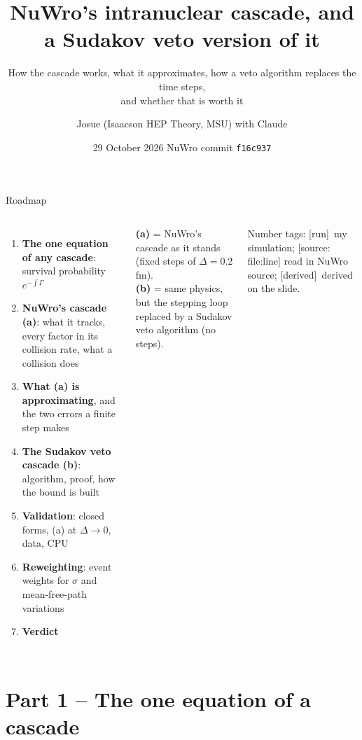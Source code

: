 \documentclass[10pt,aspectratio=169]{beamer}
\title{NuWro's intranuclear cascade, and a Sudakov veto version of it}
\subtitle{How the cascade works, what it approximates, how a veto algorithm replaces the time steps,\\ and whether that is worth it}
\author{Josue (Isaacson HEP Theory, MSU) \quad with Claude}
\date{29 October 2026 \quad\textbullet\quad NuWro commit \texttt{f16c937}}
\newcommand{\G}{\Gamma}
\newcommand{\tagrun}{{\scriptsize\color{okGreen}[run]}}
\newcommand{\tagsrc}[1]{{\scriptsize\color{aBlue}[source: #1]}}
\newcommand{\tagder}{{\scriptsize\color{black!60}[derived]}}
\begin{document}
\maketitle

\begin{frame}{Roadmap}
\begin{columns}[T]
\begin{enumerate}
\item \textbf{The one equation of any cascade}: survival probability $e^{-\int\G}$
\item \textbf{NuWro's cascade (a)}: what it tracks, every factor in its collision rate, what a collision does
\item \textbf{What (a) is approximating}, and the two errors a finite step makes
\item \textbf{The Sudakov veto cascade (b)}: algorithm, proof, how the bound is built
\item \textbf{Validation}: closed forms, (a) at $\Delta\to0$, data, CPU
\item \textbf{Reweighting}: event weights for $\sigma$ and mean-free-path variations
\item \textbf{Verdict}
\end{enumerate}
\begin{keybox}
\textbf{(a)} = NuWro's cascade as it stands (fixed steps of $\Delta=0.2$ fm).\\[3pt]
\textbf{(b)} = same physics, but the stepping loop replaced by a Sudakov veto algorithm (no steps).
\end{keybox}
\vspace{2pt}
{\small Number tags: \tagrun\ my simulation; \tagsrc{file:line} read in NuWro source; \tagder\ derived on the slide.}
\end{columns}
\end{frame}

\section{Part 1 -- The one equation of a cascade}
\end{document}
